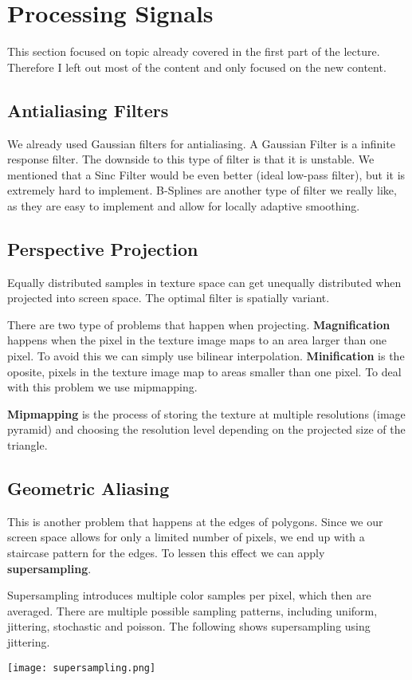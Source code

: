\section{Processing Signals}

This section focused on topic already covered in the first part of the lecture. Therefore I left out most of the content and only focused on the new content.


\subsection{Antialiasing Filters}

We already used Gaussian filters for antialiasing. A Gaussian Filter is a infinite response filter. The downside to this type of filter is that it is unstable. We mentioned that a Sinc Filter would be even better (ideal low-pass filter), but it is extremely hard to implement. B-Splines are another type of filter we really like, as they are easy to implement and allow for locally adaptive smoothing.


\subsection{Perspective Projection}

Equally distributed samples in texture space can get unequally distributed when projected into screen space. The optimal filter is spatially variant. \medskip

There are two type of problems that happen when projecting. \textbf{Magnification} happens when the pixel in the texture image maps to an area larger than one pixel. To avoid this we can simply use bilinear interpolation. \textbf{Minification} is the oposite, pixels in the texture image map to areas smaller than one pixel. To deal with this problem we use mipmapping. \medskip

\textbf{Mipmapping} is the process of storing the texture at multiple resolutions (image pyramid) and choosing the resolution level depending on the projected size of the triangle.


\subsection{Geometric Aliasing}

This is another problem that happens at the edges of polygons. Since we our screen space allows for only a limited number of pixels, we end up with a staircase pattern for the edges. To lessen this effect we can apply \textbf{supersampling}. \medskip

Supersampling introduces multiple color samples per pixel, which then are averaged. There are multiple possible sampling patterns, including uniform, jittering, stochastic and poisson. The following shows supersampling using jittering.
\begin{center}
	\texttt{[image: supersampling.png]}
\end{center}
